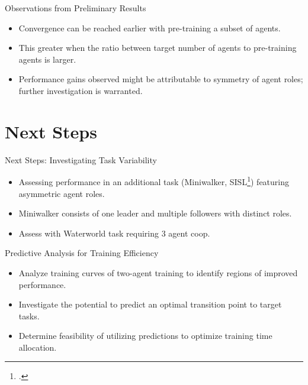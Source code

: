 \documentclass[xcolor={svgnames}]{beamer}
\begin{document}

\begin{frame}{Observations from Preliminary Results}
    \begin{itemize}
        \item Convergence can be reached earlier with pre-training a subset of agents.
        \item This greater when the ratio between target number of agents to 
            pre-training agents is larger.
        \item Performance gains observed might be attributable to symmetry of agent roles; 
            further investigation is warranted.
    \end{itemize}
\end{frame}


\section{Next Steps}


\begin{frame}{Next Steps: Investigating Task Variability}
    \begin{itemize}
        \item Assessing performance in an additional task (Miniwalker, SISL\footcite{gupta2017}) 
            featuring asymmetric agent roles.
        \item Miniwalker consists of one leader and multiple followers with distinct roles.
        \item Assess with Waterworld task requiring 3 agent coop.
    \end{itemize}
\end{frame}


\begin{frame}{Predictive Analysis for Training Efficiency}
    \begin{itemize}
        \item Analyze training curves of two-agent training to identify regions of improved performance.
        \item Investigate the potential to predict an optimal transition point to target tasks.
        \item Determine feasibility of utilizing predictions to optimize training time allocation.
    \end{itemize}
\end{frame}
\end{document}
